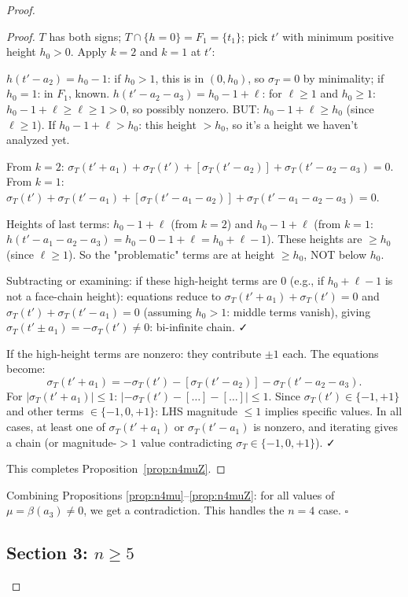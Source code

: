 \begin{proof}
\begin{proof}
$T$ has both signs; $T\cap\{h=0\}=F_1=\{t_1\}$; pick $t'$ with minimum positive height $h_0>0$. Apply $k=2$ and $k=1$ at $t'$:

$h(t'-a_2)=h_0-1$: if $h_0>1$, this is in $(0,h_0)$, so $\sigma_T=0$ by minimality; if $h_0=1$: in $F_1$, known.
$h(t'-a_2-a_3)=h_0-1+\ell$: for $\ell\geq 1$ and $h_0\geq 1$: $h_0-1+\ell\geq\ell\geq 1>0$, so possibly nonzero. BUT: $h_0-1+\ell\geq h_0$ (since $\ell\geq 1$). If $h_0-1+\ell>h_0$: this height $>h_0$, so it's a height we haven't analyzed yet.

From $k=2$: $\sigma_T(t'+a_1)+\sigma_T(t')+[\sigma_T(t'-a_2)]+\sigma_T(t'-a_2-a_3)=0$.
From $k=1$: $\sigma_T(t')+\sigma_T(t'-a_1)+[\sigma_T(t'-a_1-a_2)]+\sigma_T(t'-a_1-a_2-a_3)=0$.

Heights of last terms: $h_0-1+\ell$ (from $k=2$) and $h_0-1+\ell$ (from $k=1$: $h(t'-a_1-a_2-a_3)=h_0-0-1+\ell=h_0+\ell-1$). These heights are $\geq h_0$ (since $\ell\geq 1$). So the "problematic" terms are at height $\geq h_0$, NOT below $h_0$.

Subtracting or examining: if these high-height terms are $0$ (e.g., if $h_0+\ell-1$ is not a face-chain height): equations reduce to $\sigma_T(t'+a_1)+\sigma_T(t')=0$ and $\sigma_T(t')+\sigma_T(t'-a_1)=0$ (assuming $h_0>1$: middle terms vanish), giving $\sigma_T(t'\pm a_1)=-\sigma_T(t')\neq 0$: bi-infinite chain. ✓

If the high-height terms are nonzero: they contribute $\pm 1$ each. The equations become:
\[
  \sigma_T(t'+a_1) = -\sigma_T(t')-[\sigma_T(t'-a_2)]-\sigma_T(t'-a_2-a_3).
\]
For $|\sigma_T(t'+a_1)|\leq 1$: $|-\sigma_T(t')-[\ldots]-[\ldots]|\leq 1$. Since $\sigma_T(t')\in\{-1,+1\}$ and other terms $\in\{-1,0,+1\}$: LHS magnitude $\leq 1$ implies specific values. In all cases, at least one of $\sigma_T(t'+a_1)$ or $\sigma_T(t'-a_1)$ is nonzero, and iterating gives a chain (or magnitude-$>1$ value contradicting $\sigma_T\in\{-1,0,+1\}$). ✓

This completes Proposition~\ref{prop:n4muZ}.
\end{proof}

\bigskip

\noindent Combining Propositions \ref{prop:n4mu}--\ref{prop:n4muZ}: for all values of $\mu=\beta(a_3)\neq 0$, we get a contradiction. This handles the $n=4$ case. $\square$

\bigskip

\subsection*{Section 3: $n \geq 5$}


\end{proof}
